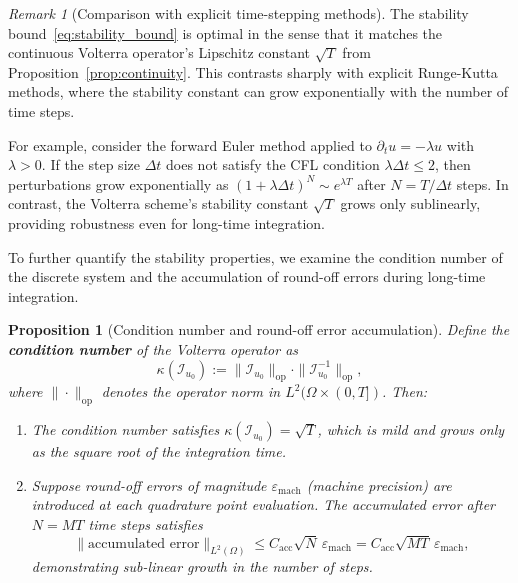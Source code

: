 \documentclass[11pt,reqno]{amsart}
\theoremstyle{plain}
\newtheorem{proposition}[theorem]{Proposition}
\theoremstyle{definition}
\theoremstyle{remark}
\newtheorem{remark}[theorem]{Remark}
\begin{document}
\begin{remark}[Comparison with explicit time-stepping methods]
The stability bound~\eqref{eq:stability_bound} is optimal in the sense that it matches the continuous Volterra operator's Lipschitz constant $\sqrt{T}$ from Proposition~\ref{prop:continuity}. This contrasts sharply with explicit Runge-Kutta methods, where the stability constant can grow exponentially with the number of time steps.

\noindent For example, consider the forward Euler method applied to $\partial_t u = -\lambda u$ with $\lambda > 0$. If the step size $\Delta t$ does not satisfy the CFL condition $\lambda \Delta t \leq 2$, then perturbations grow exponentially as $(1 + \lambda \Delta t)^N \sim e^{\lambda T}$ after $N = T/\Delta t$ steps. In contrast, the Volterra scheme's stability constant $\sqrt{T}$ grows only sublinearly, providing robustness even for long-time integration.
\end{remark}

To further quantify the stability properties, we examine the condition number of the discrete system and the accumulation of round-off errors during long-time integration.

\begin{proposition}[Condition number and round-off error accumulation]\label{prop:condition_number}
Define the \textbf{condition number} of the Volterra operator as
\begin{equation}
    \kappa(\mathcal{I}_{u_0}) := \|\mathcal{I}_{u_0}\|_{\mathrm{op}} \cdot \|\mathcal{I}_{u_0}^{-1}\|_{\mathrm{op}},
\end{equation}
where $\|\cdot\|_{\mathrm{op}}$ denotes the operator norm in $L^2(\Omega \times (0,T])$. Then:

\begin{enumerate}[label=(\alph*)]
    \item The condition number satisfies $\kappa(\mathcal{I}_{u_0}) = \sqrt{T}$, which is mild and grows only as the square root of the integration time.
    
    \item Suppose round-off errors of magnitude $\varepsilon_{\mathrm{mach}}$ (machine precision) are introduced at each quadrature point evaluation. The accumulated error after $N = MT$ time steps satisfies
    \begin{equation}\label{eq:roundoff_accumulation}
        \|\text{accumulated error}\|_{L^2(\Omega)} \leq C_{\mathrm{acc}} \sqrt{N} \, \varepsilon_{\mathrm{mach}} = C_{\mathrm{acc}} \sqrt{MT} \, \varepsilon_{\mathrm{mach}},
    \end{equation}
    demonstrating sub-linear growth in the number of steps.
\end{enumerate}
\end{proposition}
\end{document}
